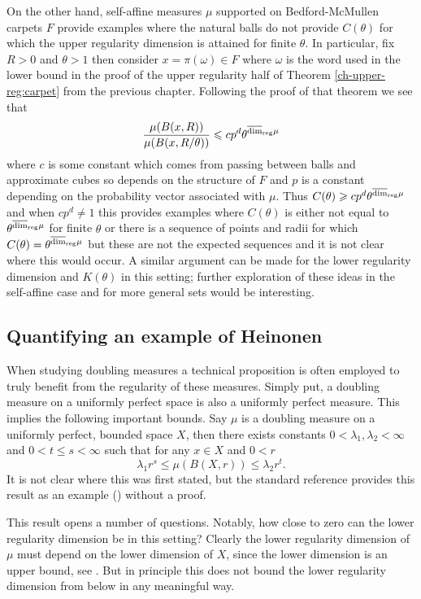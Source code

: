 On the other hand, self-affine measures $\mu$ supported on Bedford-McMullen carpets $F$ provide examples where the natural balls do not provide $C(\theta)$ for which the upper regularity dimension is attained for finite $\theta$. In particular, fix $R> 0$ and $\theta > 1$ then consider $x =\pi(\omega) \in F$ where $\omega$ is the word used in the lower bound in the proof of the upper regularity half of Theorem \ref{ch-upper-reg:carpet} from the previous chapter. Following the proof of that theorem we see that
\[
\frac{\mu(B(x,R))}{\mu(B(x,R/\theta))} \leqslant c p^d \theta^{\overline{\dim}_{\textup{reg}} \mu}
\]
where $c$ is some constant which comes from passing between balls and approximate cubes so depends on the structure of $F$ and $p$ is a constant depending on the probability vector associated with $\mu$. Thus $C(\theta) \geqslant cp^d \theta^{\overline{\dim}_{\textup{reg}} \mu}$ and when $cp^d \neq 1$ this provides examples where $C(\theta)$ is either not equal to $\theta^{\overline{\dim}_{\textup{reg}} \mu}$ for finite $\theta$ or there is a sequence of points and radii for which $C(\theta) = \theta^{\overline{\dim}_{\textup{reg}} \mu}$ but these are not the expected sequences and it is not clear where this would occur. A similar argument can be made for the lower regularity dimension and $K(\theta)$ in this setting; further exploration of these ideas in the self-affine case and for more general sets would be interesting.


\subsection{Quantifying an example of Heinonen}\label{ch-quantifying:sec:quantifying}


When studying doubling measures a technical proposition is often employed to truly benefit from the regularity of these measures. Simply put, a doubling measure on a uniformly perfect space is also a uniformly perfect measure. This implies the following important bounds. Say $\mu$ is a doubling measure on a uniformly perfect, bounded space $X$, then there exists constants $0< \lambda_1, \lambda_2 < \infty$ and $0 < t \le s < \infty$ such that for any $x \in X$ and $0 < r$
\[
\lambda_1 r^s \le \mu(B(X,r)) \le \lambda_2 r^t.
\]
It is not clear where this was first stated, but the standard reference \cite{heinonen} provides this result as an example (\cite[Exercise 13.1]{heinonen}) without a proof. 

This result opens a number of questions. Notably, how close to zero can the lower regularity dimension be in this setting? Clearly the lower regularity dimension of $\mu$ must depend on the lower dimension of $X$, since the lower dimension is an upper bound, see \cite{bylund}. But in principle this does not bound the lower regularity dimension from below in any meaningful way. 

